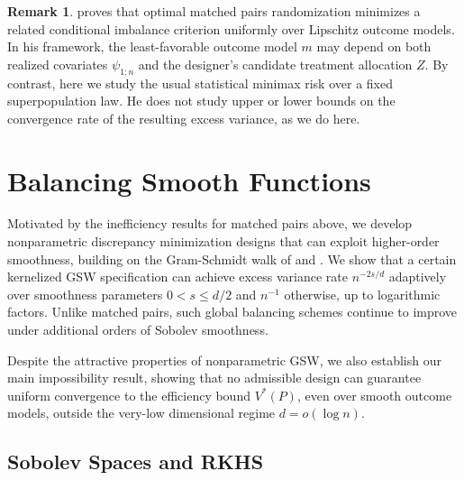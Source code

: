 \documentclass[letterpaper,12pt]{article}
\theoremstyle{definition}
\newtheorem{remark}[thm]{Remark}
\numberwithin{equation}{section}
\begin{document}
\begin{remark}
\citet{kallus2018} proves that optimal matched pairs randomization minimizes a related conditional imbalance criterion uniformly over Lipschitz outcome models.
In his framework, the least-favorable outcome model $m$ may depend on both realized covariates $\psi_{1:n}$ and the designer's candidate treatment allocation $Z$.
By contrast, here we study the usual statistical minimax risk over a fixed superpopulation law.
He does not study upper or lower bounds on the convergence rate of the resulting excess variance, as we do here.
\end{remark}

\section{Balancing Smooth Functions}\label{section:structure}

Motivated by the inefficiency results for matched pairs above, we develop nonparametric discrepancy minimization designs that can exploit higher-order smoothness, building on the Gram-Schmidt walk of \cite{bansal2019gram} and \cite{harshaw2024gsw}.
We show that a certain kernelized GSW specification can achieve excess variance rate $n^{-2s/d}$ adaptively over smoothness parameters $0 < s \leq d / 2$ and $n^{-1}$ otherwise, up to logarithmic factors.
Unlike matched pairs, such global balancing schemes continue to improve under additional orders of Sobolev smoothness.

Despite the attractive properties of nonparametric GSW, we also establish our main impossibility result, showing that no admissible design can guarantee uniform convergence to the efficiency bound $V^*(P)$, even over smooth outcome models, outside the very-low dimensional regime $d=o(\log n)$.


\subsection{Sobolev Spaces and RKHS}\label{subsection:sobolev-models}
\end{document}
